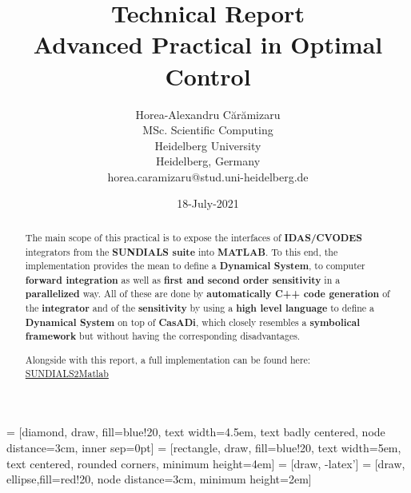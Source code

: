 \documentclass[12pt, letterpaper]{article}
\begin{document}
 = [diamond, draw, fill=blue!20, 
    text width=4.5em, text badly centered, node distance=3cm, inner sep=0pt]
 = [rectangle, draw, fill=blue!20, 
    text width=5em, text centered, rounded corners, minimum height=4em]
 = [draw, -latex']
 = [draw, ellipse,fill=red!20, node distance=3cm,
    minimum height=2em]


\title{Technical Report \\  Advanced Practical in Optimal Control }



\author{ Horea-Alexandru C\u{a}r\u{a}mizaru \\
MSc. Scientific Computing\\
Heidelberg University \\
Heidelberg, Germany \\
horea.caramizaru@stud.uni-heidelberg.de
}
\date{18-July-2021}


\maketitle

\begin{abstract}

The main scope of this practical is to expose the interfaces of \textbf{IDAS/CVODES} integrators from the \textbf{SUNDIALS suite} \cite{hindmarsh2005sundials} into \textbf{MATLAB}. To this end, the implementation provides the mean to define a \textbf{Dynamical System}, to computer \textbf{forward integration} as well as \textbf{first and second order sensitivity} in a \textbf{ parallelized} way. All of these are done by \textbf{automatically C++ code generation} of the \textbf{integrator} and of the \textbf{sensitivity} by using a \textbf{high level language} to define a \textbf{Dynamical System} on top of \textbf{CasADi}, which closely resembles a \textbf{symbolical framework} but without having the corresponding disadvantages.

Alongside with this report, a full implementation can be found here: \href{https://github.com/nashmit/SUNDIALS2Matlab}{SUNDIALS2Matlab}

\end{abstract}
\end{document}

